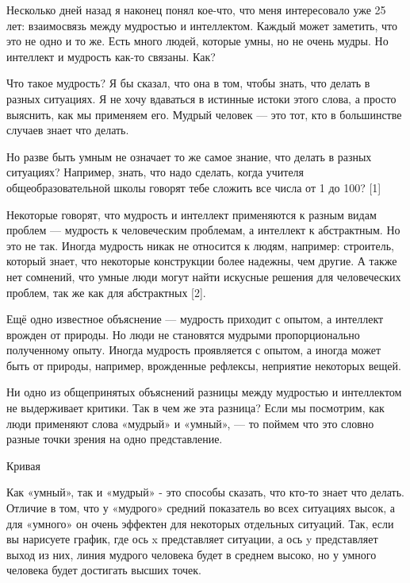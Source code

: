 \documentclass[ebook,12pt,oneside,openany]{memoir}
\date{}
\begin{document}
\maketitle

Несколько дней назад я наконец понял кое-что, что меня интересовало
уже 25 лет: взаимосвязь между мудростью и интеллектом. Каждый может
заметить, что это не одно и то же. Есть много людей, которые умны, но
не очень мудры. Но интеллект и мудрость как-то связаны. Как?

Что такое мудрость? Я бы сказал, что она в том, чтобы знать, что
делать в разных ситуациях. Я не хочу вдаваться в истинные истоки этого
слова, а просто выяснить, как мы применяем его. Мудрый человек — это
тот, кто в большинстве случаев знает что делать.

Но разве быть умным не означает то же самое знание, что делать в
разных ситуациях? Например, знать, что надо сделать, когда учителя
общеобразовательной школы говорят тебе сложить все числа от 1 до 100?
[1]

Некоторые говорят, что мудрость и интеллект применяются к разным видам
проблем — мудрость к человеческим проблемам, а интеллект к
абстрактным. Но это не так. Иногда мудрость никак не относится к
людям, например: строитель, который знает, что некоторые конструкции
более надежны, чем другие. А также нет сомнений, что умные люди могут
найти искусные решения для человеческих проблем, так же как для
абстрактных [2].

Ещё одно известное объяснение — мудрость приходит с опытом, а
интеллект врожден от природы. Но люди не становятся мудрыми
пропорционально полученному опыту. Иногда мудрость проявляется с
опытом, а иногда может быть от природы, например, врожденные рефлексы,
неприятие некоторых вещей.

Ни одно из общепринятых объяснений разницы между мудростью и
интеллектом не выдерживает критики. Так в чем же эта разница? Если мы
посмотрим, как люди применяют слова «мудрый» и «умный», — то поймем
что это словно разные точки зрения на одно представление.

Кривая

Как «умный», так и «мудрый» - это способы сказать, что кто-то знает
что делать. Отличие в том, что у «мудрого» средний показатель во всех
ситуациях высок, а для «умного» он очень эффектен для некоторых
отдельных ситуаций. Так, если вы нарисуете график, где ось x
представляет ситуации, а ось y представляет выход из них, линия
мудрого человека будет в среднем высоко, но у умного человека будет
достигать высших точек.
\end{document}
